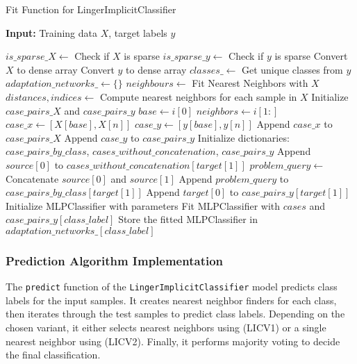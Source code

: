 \documentclass[a4paper, 12pt]{report}
\begin{document}
\begin{algorithm}[H]
    \caption{Fit Function for LingerImplicitClassifier}
    \textbf{Input:} Training data $X$, target labels $y$
    \label{alg:linger_implicit_classifier_fit_implementation}
    \begin{algorithmic}[1]
            \State $is\_sparse\_X \gets$ Check if $X$ is sparse
            \State $is\_sparse\_y \gets$ Check if $y$ is sparse
                \State Convert $X$ to dense array
            \EndIf
                \State Convert $y$ to dense array
            \EndIf
            \State $classes\_ \gets$ Get unique classes from $y$
            \State $adaptation\_networks\_ \gets \{\}$
            \State $neighbours \gets$ Fit Nearest Neighbors with $X$
            \State $distances, indices \gets$ Compute nearest neighbors for each sample in $X$
            \State Initialize $case\_pairs\_X$ and $case\_pairs\_y$
                \State $base \gets i[0]$
                \State $neighbors \gets i[1:]$
                    \State $case\_x \gets [X[base],  X[n]]$
                    \State $case\_y \gets [y[base], y[n]]$
                    \State Append $case\_x$ to $case\_pairs\_X$
                    \State Append $case\_y$ to $case\_pairs\_y$
                \EndFor
            \EndFor
            \State Initialize dictionaries: $case\_pairs\_by\_class$, $cases\_without\_concatenation$, $case\_pairs\_y$
                \State Append $source[0]$ to $cases\_without\_concatenation[target[1]]$
                \State $problem\_query \gets$ Concatenate $source[0]$ and $source[1]$
                \State Append $problem\_query$ to $case\_pairs\_by\_class[target[1]]$
                \State Append $target[0]$ to $case\_pairs\_y[target[1]]$
            \EndFor
                \State Initialize MLPClassifier with parameters
                \State Fit MLPClassifier with $cases$ and $case\_pairs\_y[class\_label]$
                \State Store the fitted MLPClassifier in $adaptation\_networks\_[class\_label]$
            \EndFor
        \EndFunction
    \end{algorithmic}
\end{algorithm}
\subsubsection{Prediction Algorithm Implementation}
\label{sec:prediction_implementation_LIC}
The \texttt{predict} function of the \texttt{LingerImplicitClassifier} model predicts class labels for the input samples. 
It creates nearest neighbor finders for each class, then iterates through the test samples to predict class labels. 
Depending on the chosen variant, it either selects nearest neighbors using (LICV1) or a single nearest neighbor using (LICV2). 
Finally, it performs majority voting to decide the final classification.
\end{document}
